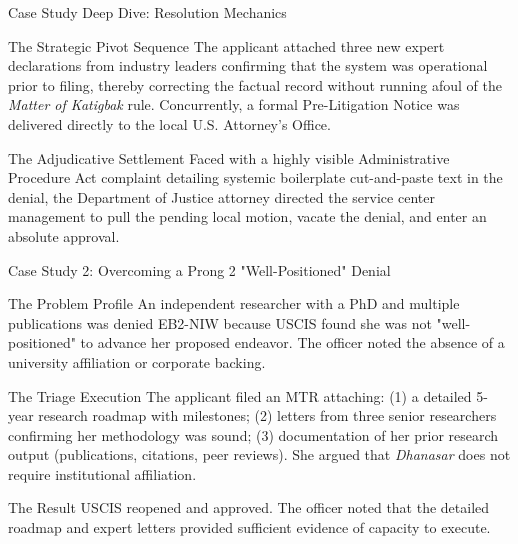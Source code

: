 \documentclass[11pt]{beamer}
\begin{document}
	\begin{frame}{Case Study Deep Dive: Resolution Mechanics}
		\scriptsize
		\begin{block}{The Strategic Pivot Sequence}
			The applicant attached three new expert declarations from industry leaders confirming that the system was operational prior to filing, thereby correcting the factual record without running afoul of the \textit{Matter of Katigbak} rule. Concurrently, a formal Pre-Litigation Notice was delivered directly to the local U.S. Attorney's Office.
		\end{block}
		\begin{block}{The Adjudicative Settlement}
			Faced with a highly visible Administrative Procedure Act complaint detailing systemic boilerplate cut-and-paste text in the denial, the Department of Justice attorney directed the service center management to pull the pending local motion, vacate the denial, and enter an absolute approval.
		\end{block}
	\end{frame}
	
	\begin{frame}{Case Study 2: Overcoming a Prong 2 "Well-Positioned" Denial}
		\scriptsize
		\begin{block}{The Problem Profile}
			An independent researcher with a PhD and multiple publications was denied EB2-NIW because USCIS found she was not "well-positioned" to advance her proposed endeavor. The officer noted the absence of a university affiliation or corporate backing.
		\end{block}
		\begin{block}{The Triage Execution}
			The applicant filed an MTR attaching: (1) a detailed 5-year research roadmap with milestones; (2) letters from three senior researchers confirming her methodology was sound; (3) documentation of her prior research output (publications, citations, peer reviews). She argued that \textit{Dhanasar} does not require institutional affiliation.
		\end{block}
		\begin{block}{The Result}
			USCIS reopened and approved. The officer noted that the detailed roadmap and expert letters provided sufficient evidence of capacity to execute.
		\end{block}
	\end{frame}
	
\end{document}

